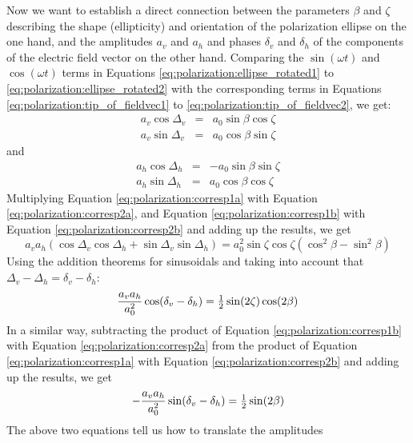 Now we want to establish a direct connection between the parameters
$\beta$ and $\zeta$ describing the shape (ellipticity) and orientation
of the polarization ellipse on the one hand, and the amplitudes $a_v$
and $a_h$ and phases $\delta_v$ and $\delta_h$ of the components of
the electric field vector on the other hand.  Comparing the
$\sin(\omega t)$ and $\cos(\omega t)$ terms in
Equations \ref{eq:polarization:ellipse_rotated1} to
\ref{eq:polarization:ellipse_rotated2} with the corresponding terms
in Equations \ref{eq:polarization:tip_of_fieldvec1} to
\ref{eq:polarization:tip_of_fieldvec2}, we get:
\begin{eqnarray}
  \label{eq:polarization:corresp1a}
 a_v \cos\Delta_v &=& a_0 \sin\beta \cos\zeta\\
  \label{eq:polarization:corresp1b}
 a_v \sin\Delta_v &=& a_0 \cos\beta \sin\zeta
\end{eqnarray}
and 
\begin{eqnarray}
  \label{eq:polarization:corresp2a}
 a_h \cos\Delta_h &=& -a_0 \sin\beta \sin\zeta\\
  \label{eq:polarization:corresp2b}
 a_h \sin\Delta_h &=&  a_0 \cos\beta \cos\zeta
\end{eqnarray}
Multiplying Equation \ref{eq:polarization:corresp1a} with
Equation \ref{eq:polarization:corresp2a}, and
Equation \ref{eq:polarization:corresp1b} with
Equation \ref{eq:polarization:corresp2b} and adding up the results, we get
\begin{equation}
  a_v a_h (\cos\Delta_v\cos\Delta_h + \sin\Delta_v\sin\Delta_h)
  = a_0^2 \sin\zeta\cos\zeta (\cos^2\beta - \sin^2\beta) 
\end{equation}
Using the addition theorems for sinusoidals and taking into account
that
$\Delta_v-\Delta_h = \delta_v-\delta_h$:
\begin{equation}
  \label{eq:polarization:sinzetacosbeta}
  \frac{a_v a_h}{a_0^2} \cos(\delta_v-\delta_h)
  = \textstyle\frac{1}{2}\sin(2\zeta)\cos(2\beta)
\end{equation}
In a similar way, subtracting the product of
Equation \ref{eq:polarization:corresp1b} with
Equation \ref{eq:polarization:corresp2a} from the product of
Equation \ref{eq:polarization:corresp1a} with
Equation \ref{eq:polarization:corresp2b} and adding up the results, we get
\begin{equation}
  \label{eq:polarization:sinbeta}
  -\frac{a_v a_h}{a_0^2} \sin(\delta_v-\delta_h)
  = \textstyle\frac{1}{2}\sin(2\beta)
\end{equation}
The above two equations tell us how to translate the amplitudes
